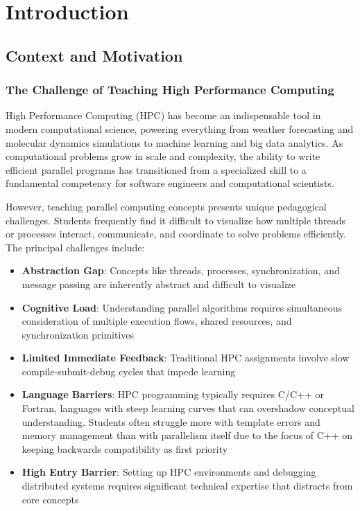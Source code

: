 
\chapter{Introduction}
\label{ch:introduction}



\section{Context and Motivation}
\label{sec:context-motivation}

\subsection{The Challenge of Teaching High Performance Computing}
\label{subsec:hpc-challenge}

High Performance Computing (HPC) has become an indispensable tool in modern computational science, powering everything from weather forecasting and molecular dynamics simulations to machine learning and big data analytics. As computational problems grow in scale and complexity, the ability to write efficient parallel programs has transitioned from a specialized skill to a fundamental competency for software engineers and computational scientists.

However, teaching parallel computing concepts presents unique pedagogical challenges. Students frequently find it difficult to visualize how multiple threads or processes interact, communicate, and coordinate to solve problems efficiently. The principal challenges include:

\begin{itemize}
    \item \textbf{Abstraction Gap}: Concepts like threads, processes, synchronization, and message passing are inherently abstract and difficult to visualize
    \item \textbf{Cognitive Load}: Understanding parallel algorithms requires simultaneous consideration of multiple execution flows, shared resources, and synchronization primitives
    \item \textbf{Limited Immediate Feedback}: Traditional HPC assignments involve slow compile-submit-debug cycles that impede learning
    \item \textbf{Language Barriers}: HPC programming typically requires C/C++ or Fortran, languages with steep learning curves that can overshadow conceptual understanding. Students often struggle more with template errors and memory management than with parallelism itself due to the focus of C++ on keeping backwards compatibility as first priority
    \item \textbf{High Entry Barrier}: Setting up HPC environments and debugging distributed systems requires significant technical expertise that distracts from core concepts
\end{itemize}

